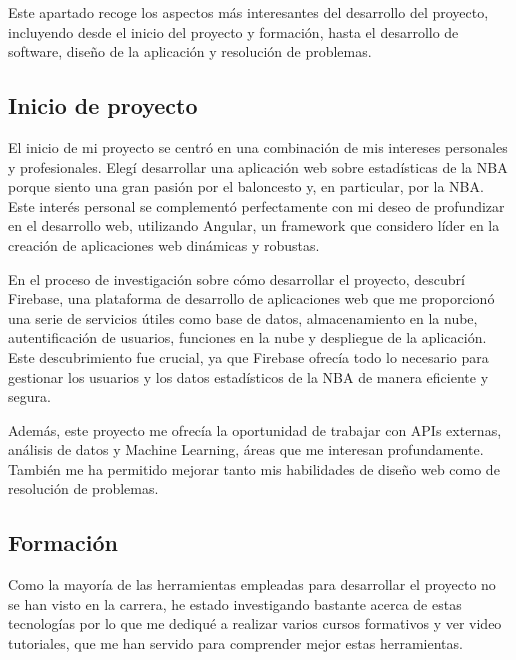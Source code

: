 
Este apartado recoge los aspectos más interesantes del desarrollo del proyecto, incluyendo desde el inicio del proyecto y formación, hasta el desarrollo de software, diseño de la aplicación y resolución de problemas.


\subsection{Inicio de proyecto}
El inicio de mi proyecto se centró en una combinación de mis intereses personales y profesionales. Elegí desarrollar una aplicación web sobre estadísticas de la NBA porque siento una gran pasión por el baloncesto y, en particular, por la NBA. Este interés personal se complementó perfectamente con mi deseo de profundizar en el desarrollo web, utilizando Angular, un framework que considero líder en la creación de aplicaciones web dinámicas y robustas.

En el proceso de investigación sobre cómo desarrollar el proyecto, descubrí Firebase, una plataforma de desarrollo de aplicaciones web que me proporcionó una serie de servicios útiles como base de datos, almacenamiento en la nube, autentificación de usuarios, funciones en la nube y despliegue de la aplicación. Este descubrimiento fue crucial, ya que Firebase ofrecía todo lo necesario para gestionar los usuarios y los datos estadísticos de la NBA de manera eficiente y segura.

Además, este proyecto me ofrecía la oportunidad de trabajar con APIs externas, análisis de datos y Machine Learning, áreas que me interesan profundamente. También me ha permitido mejorar tanto mis habilidades de diseño web como de resolución de problemas.


\subsection{Formación}
Como la mayoría de las herramientas empleadas para desarrollar el proyecto no se han visto en la carrera, he estado investigando bastante acerca de estas tecnologías por lo que me dediqué a realizar varios cursos formativos y ver video tutoriales, que me han servido para comprender mejor estas herramientas.

